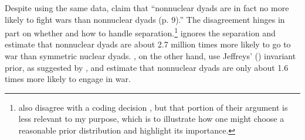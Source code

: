 \documentclass[12pt]{article}
\begin{document}
Despite using the same data, \cite{BellMiller2014} claim that ``nonnuclear dyads are in fact no more likely to fight wars than nonnuclear dyads (p. 9).'' The disagreement hinges in part on whether and how to handle separation.\footnote{\cite{BellMiller2014} also disagree with a coding decision \cite{Rauchhaus2009}, but that portion of their argument is less relevant to my purpose, which is to illustrate how one might choose a reasonable prior distribution and highlight its importance.} \cite{Rauchhaus2009} ignores the separation and estimate that nonnuclear dyads are about 2.7 million times more likely to go to war than symmetric nuclear dyads. \cite{BellMiller2014}, on the other hand, use Jeffreys' (\citeyear{1946}) invariant prior, as suggested by \cite{Zorn2005}, and estimate that nonnuclear dyads are only about 1.6 times more likely to engage in war.



\clearpage


\end{document}

